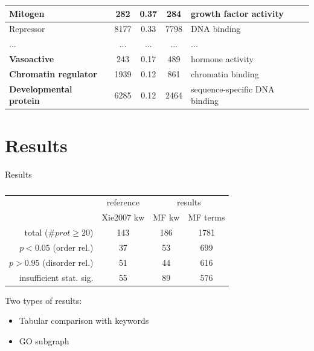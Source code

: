 \documentclass{beamer}
\newcommand{\keyword}[1]{\textbf{#1}}
\begin{document}
\begin{frame}
\begin{tabular}{|p{4.2cm}|c|c|c|p{4.3cm}|}
    Mitogen                            & 282   & 0.37  & 284   & growth factor activity \\ \hline
    Repressor                          & 8177  & 0.33  & 7798  & DNA binding \\ \hline
    ... & ... & ... & ... &  ...\\
    \hline
    \keyword{Vasoactive}                            & 243   & 0.17  & 489   & hormone activity \\ \hline
    \keyword{Chromatin regulator}                   & 1939  & 0.12  & 861   & chromatin binding \\ \hline
    \keyword{Developmental protein}                 & 6285  & 0.12  & 2464  & sequence-specific DNA binding \\ \hline
  \end{tabular}

\end{frame}




\section{Results}


\begin{frame}{Results}

  \begin{table}[htpb]
    \centering
    \begin{tabular}{|r|c|c|c|}
      \hline
      & \small reference & \multicolumn{2}{c|}{results} \\
      & Xie2007 kw &  MF kw  & MF terms  \\
      \hline
      total ($\# prot\ge20$)         & 143  & 186    & 1781          \\
      $p<0.05$ (order rel.)          & 37   & 53     & 699           \\
      $p>0.95$ (disorder rel.)       & 51   & 44     & 616           \\
       insufficient stat. sig.         & 55   & 89     & 576           \\
      \hline
    \end{tabular}
  \caption{}
  \end{table}

  \pause

  Two types of results:
  \begin{itemize}
    \item Tabular comparison with keywords
    \item GO subgraph
  \end{itemize}

\end{frame}
\end{document}
